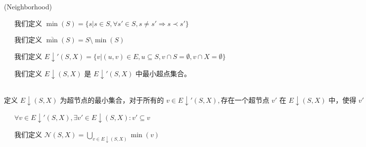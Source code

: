 \documentclass[fontset=none]{ctexart}
\begin{document}
\begin{definition}{(Neighborhood)}

    \ \ \ 我们定义 $\min(S) = \{s | s \in S, \forall s' \in S, s \neq s' \Rightarrow s \prec s'\}$

    \ \ \ 我们定义 $\overline{\min}(S) = S \setminus \min(S)$

    \ \ \ 我们定义 $E\downarrow' (S,X) = \{v | (u,v) \in E, u \subseteq S, v \cap S = \emptyset, v \cap X = \emptyset\}$

    \ \ \ 我们定义 $E\downarrow (S,X)$ 是 $E\downarrow' (S,X)$ 中最小超点集合。

    \ \ \ $\text{定义 } E \downarrow (S, X) \text{ 为超节点的最小集合，对于所有的 } v \in E\downarrow' (S,X), \text{存在一个超节点 } v' \text{ 在 } E\downarrow (S, X) \text{ 中，使得 } v' \subseteq v.$

    \ \ \ $\forall v \in E\downarrow' (S,X), \exists v' \in E\downarrow (S, X):v' \subseteq v$

    \ \ \ 我们定义 $\mathcal{N}(S,X) = \bigcup\limits_{v \in E\downarrow(S,X)} \min(v)$
 

\end{definition}
\end{document}
